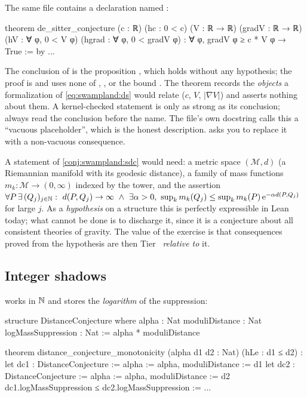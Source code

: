 The same file contains a declaration named :
\begin{leancode}
theorem de_sitter_conjecture (c : ℝ) (hc : 0 < c) (V : ℝ → ℝ) (gradV : ℝ → ℝ)
    (hV : ∀ φ, 0 < V φ)
    (hgrad : ∀ φ, 0 < gradV φ) :
    ∀ φ, gradV φ ≥ c * V φ → True := by ...
\end{leancode}

\begin{pitfallbox}
The conclusion of  is the proposition , which holds
without any hypothesis; the proof is  and uses none of ,
,  or the bound . The theorem records the
\emph{objects} a formalization of \eqref{eq:swampland:ds} would relate ($c$, $V$, $|\nabla V|$) and
asserts nothing about them. A kernel-checked statement is only as strong as its conclusion;
always read the conclusion before the name. The file's own docstring calls this a ``vacuous
placeholder'', which is the honest description.  asks you to replace it
with a non-vacuous consequence.
\end{pitfallbox}

\begin{physicsbox}
A statement of \cref{conj:swampland:sdc} would need: a metric space $(\mathcal M,d)$ (a Riemannian
manifold with its geodesic distance), a family of mass functions $m_k:\mathcal M\to(0,\infty)$
indexed by the tower, and the assertion
$\forall P\,\exists\,(Q_j)_{j\in\N}:\ d(P,Q_j)\to\infty\ \wedge\ \exists\alpha>0,\
\sup_km_k(Q_j)\le\sup_km_k(P)\,\ee^{-\alpha d(P,Q_j)}$ for large $j$. As a \emph{hypothesis} on a
structure this is perfectly expressible in Lean today; what cannot be done is to discharge it, since
it is a conjecture about all consistent theories of gravity. The value of the exercise is that
consequences proved from the hypothesis are then Tier~\TA{} \emph{relative to} it.
\end{physicsbox}

\subsection{Integer shadows}

 works in $\mathbb{N}$ and stores the
\emph{logarithm} of the suppression:
\begin{leancode}
structure DistanceConjecture where
  alpha : Nat
  moduliDistance : Nat
  logMassSuppression : Nat := alpha * moduliDistance

theorem distance_conjecture_monotonicity (alpha d1 d2 : Nat)
    (hLe : d1 ≤ d2) :
    let dc1 : DistanceConjecture := { alpha := alpha, moduliDistance := d1 }
    let dc2 : DistanceConjecture := { alpha := alpha, moduliDistance := d2 }
    dc1.logMassSuppression ≤ dc2.logMassSuppression := ...
\end{leancode}


